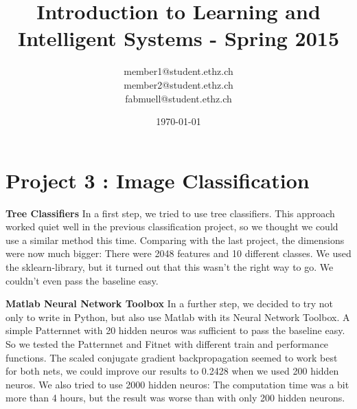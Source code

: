 \documentclass[a4paper, 11pt]{article}
\title{Introduction to Learning and Intelligent Systems - Spring 2015}
\author{member1@student.ethz.ch\\ member2@student.ethz.ch\\ fabmuell@student.ethz.ch\\}
\date{\today}
\begin{document}
\maketitle

\section*{Project 3 : Image Classification}

\textbf{Tree Classifiers} \newline
In a first step, we tried to use tree classifiers. This approach worked quiet well in the previous classification project, so we thought we could use a similar method this time. Comparing with the last project, the dimensions were now much bigger: There were 2048 features and 10 different classes. We used the sklearn-library, but it turned out that this wasn't the right way to go. We couldn't even pass the baseline easy. \newline

\textbf{Matlab Neural Network Toolbox} \newline
In a further step, we decided to try not only to write in Python, but also use Matlab with its Neural Network Toolbox. A simple Patternnet with 20 hidden neuros was sufficient to pass the baseline easy. So we tested the Patternnet and Fitnet with different train and performance functions. The scaled conjugate gradient backpropagation seemed to work best for both nets, we could improve our results to 0.2428 when we used 200 hidden neuros. We also tried to use 2000 hidden neuros: The computation time was a bit more than 4 hours, but the result was worse than with only 200 hidden neurons. 
\end{document}
